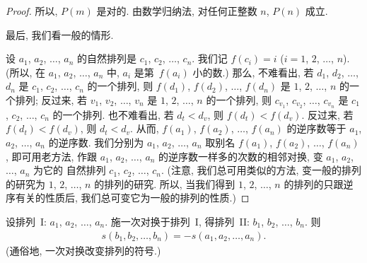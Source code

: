 \documentclass[../libro.tex]{subfiles}
\begin{document}
\begin{proof}
    所以, \(P(m)\) 是对的.
    由数学归纳法,
    对任何正整数 \(n\), \(P(n)\) 成立.

    最后, 我们看一般的情形.

    设 \(a_1\), \(a_2\), \(\dots\), \(a_n\)
    的自然排列是 \(c_1\), \(c_2\), \(\dots\), \(c_n\).
    我们记 \(f(c_i) = i\)
    (\(i = 1\), \(2\), \(\dots\), \(n\)).
    (所以, 在 \(a_1\), \(a_2\), \(\dots\), \(a_n\) 中,
    \(a_i\) 是第~\(f(a_i)\) 小的数.)
    那么, 不难看出,
    若 \(d_1\), \(d_2\), \(\dots\), \(d_n\)
    是 \(c_1\), \(c_2\), \(\dots\), \(c_n\)
    的一个排列,
    则 \(f(d_1)\), \(f(d_2)\), \(\dots\), \(f(d_n)\)
    是 \(1\), \(2\), \(\dots\), \(n\)
    的一个排列;
    反过来, 若 \(v_1\), \(v_2\), \(\dots\), \(v_n\) 是
    \(1\), \(2\), \(\dots\), \(n\) 的一个排列,
    则 \(c_{v_1}\), \(c_{v_2}\), \(\dots\), \(c_{v_n}\)
    是 \(c_1\), \(c_2\), \(\dots\), \(c_n\) 的一个排列.
    也不难看出, 若 \(d_t < d_v\), 则 \(f(d_t) < f(d_v)\).
    反过来, 若 \(f(d_t) < f(d_v)\), 则 \(d_t < d_v\).
    从而, \(f(a_1)\), \(f(a_2)\), \(\dots\), \(f(a_n)\)
    的逆序数等于 \(a_1\), \(a_2\), \(\dots\), \(a_n\)
    的逆序数.
    我们分别为 \(a_1\), \(a_2\), \(\dots\), \(a_n\)
    取别名 \(f(a_1)\), \(f(a_2)\), \(\dots\), \(f(a_n)\),
    即可用老方法,
    作跟 \(a_1\), \(a_2\), \(\dots\), \(a_n\)
    的逆序数一样多的次数的相邻对换,
    变 \(a_1\), \(a_2\), \(\dots\), \(a_n\) 为它的%
    自然排列 \(c_1\), \(c_2\), \(\dots\), \(c_n\).
    (注意, 我们总可用类似的方法, %
    变一般的排列的研究为
    \(1\), \(2\), \(\dots\), \(n\) 的排列的研究.
    所以, 当我们得到
    \(1\), \(2\), \(\dots\), \(n\)
    的排列的只跟逆序有关的性质后,
    我们总可变它为一般的排列的性质.) %
\end{proof}

\begin{theorem}
    设排列~I: \(a_1\), \(a_2\), \(\dots\), \(a_n\).
    施一次对换于排列~I,
    得排列~II: \(b_1\), \(b_2\), \(\dots\), \(b_n\).
    则
    \begin{align*}
        s(b_1, b_2, \dots, b_n) = -s(a_1, a_2, \dots, a_n).
    \end{align*}
    (通俗地, 一次对换改变排列的符号.)
\end{theorem}
\end{document}
